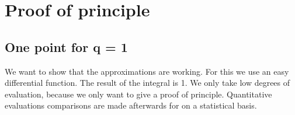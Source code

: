 \documentclass[letterpaper,10pt,english]{sphinxmanual}
\begin{document}
{
\begin{sphinxVerbatim}[commandchars=\\\{\}]
\llap{\color{nbsphinxin}[ ]:\,\hspace{\fboxrule}\hspace{\fboxsep}}
\end{sphinxVerbatim}
}


\chapter{Proof of principle}
\label{\detokenize{examples/Proof_of_principle:Proof-of-principle}}\label{\detokenize{examples/Proof_of_principle::doc}}

\section{One point for q = 1}
\label{\detokenize{examples/Proof_of_principle:One-point-for-q-=-1}}
We want to show that the approximations are working. For this we use an easy differential function. The result of the integral is 1. We only take low degrees of evaluation, because we only want to give a proof of principle. Quantitative evaluations comparisons are made afterwards for on a statistical basis.

{
\begin{sphinxVerbatim}[commandchars=\\\{\}]
\llap{\color{nbsphinxin}[1]:\,\hspace{\fboxrule}\hspace{\fboxsep}}   
   
   
   

 
   

\end{sphinxVerbatim}
}
\end{document}
